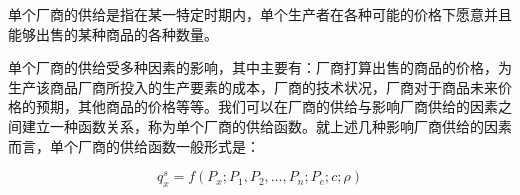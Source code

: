 {\hei 单个厂商的供给}是指在某一特定时期内，单个生产者在各种可能的价格下愿意并且能够出售的某种商品的各种数量。

单个厂商的供给受多种因素的影响，其中主要有：厂商打算出售的商品的价格，为生产该商品厂商所投入的生产要素的成本，厂商的技术状况，厂商对于商品未来价格的预期，其他商品的价格等等。我们可以在厂商的供给与影响厂商供给的因素之间建立一种函数关系，称为{\hei 单个厂商的供给函数}。就上述几种影响厂商供给的因素而言，单个厂商的供给函数一般形式是：

\begin{equation} \label{eq:2-7}
	q_x^s = f(P_x; P_1,P_2,\dots,P_n; P_e; c; \rho)
\end{equation}



\newpage

